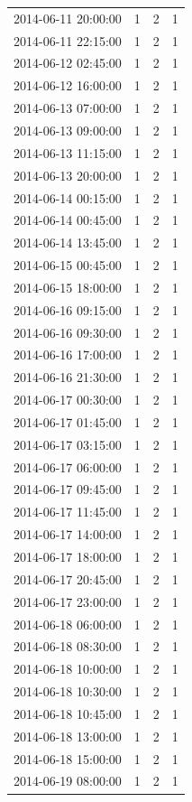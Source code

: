 \begin{tabular}{lrrr}
2014-06-11 20:00:00 & 1 & 2 & 1 \\
2014-06-11 22:15:00 & 1 & 2 & 1 \\
2014-06-12 02:45:00 & 1 & 2 & 1 \\
2014-06-12 16:00:00 & 1 & 2 & 1 \\
2014-06-13 07:00:00 & 1 & 2 & 1 \\
2014-06-13 09:00:00 & 1 & 2 & 1 \\
2014-06-13 11:15:00 & 1 & 2 & 1 \\
2014-06-13 20:00:00 & 1 & 2 & 1 \\
2014-06-14 00:15:00 & 1 & 2 & 1 \\
2014-06-14 00:45:00 & 1 & 2 & 1 \\
2014-06-14 13:45:00 & 1 & 2 & 1 \\
2014-06-15 00:45:00 & 1 & 2 & 1 \\
2014-06-15 18:00:00 & 1 & 2 & 1 \\
2014-06-16 09:15:00 & 1 & 2 & 1 \\
2014-06-16 09:30:00 & 1 & 2 & 1 \\
2014-06-16 17:00:00 & 1 & 2 & 1 \\
2014-06-16 21:30:00 & 1 & 2 & 1 \\
2014-06-17 00:30:00 & 1 & 2 & 1 \\
2014-06-17 01:45:00 & 1 & 2 & 1 \\
2014-06-17 03:15:00 & 1 & 2 & 1 \\
2014-06-17 06:00:00 & 1 & 2 & 1 \\
2014-06-17 09:45:00 & 1 & 2 & 1 \\
2014-06-17 11:45:00 & 1 & 2 & 1 \\
2014-06-17 14:00:00 & 1 & 2 & 1 \\
2014-06-17 18:00:00 & 1 & 2 & 1 \\
2014-06-17 20:45:00 & 1 & 2 & 1 \\
2014-06-17 23:00:00 & 1 & 2 & 1 \\
2014-06-18 06:00:00 & 1 & 2 & 1 \\
2014-06-18 08:30:00 & 1 & 2 & 1 \\
2014-06-18 10:00:00 & 1 & 2 & 1 \\
2014-06-18 10:30:00 & 1 & 2 & 1 \\
2014-06-18 10:45:00 & 1 & 2 & 1 \\
2014-06-18 13:00:00 & 1 & 2 & 1 \\
2014-06-18 15:00:00 & 1 & 2 & 1 \\
2014-06-19 08:00:00 & 1 & 2 & 1 \\

\end{tabular}
